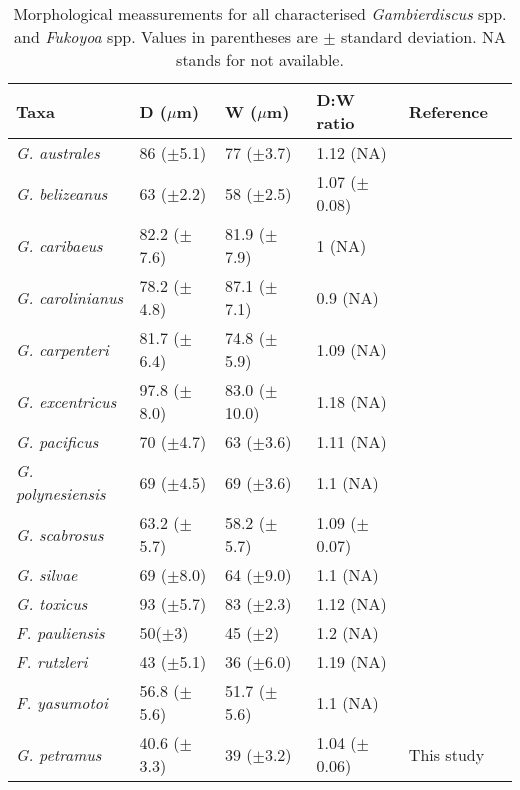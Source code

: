 \documentclass[12pt]{article}
\begin{document}
\FloatBarrier
\begin{table}
\caption{Morphological meassurements for all characterised \emph{Gambierdiscus} spp. and \emph{Fukoyoa} spp. Values in parentheses are $\pm$ standard deviation. NA stands for not available.}
\label{tbl:GlobalSizeTable}
\begin{tabular}{ | p{3.5cm} | p{2.5cm} | p{2.5cm} | p{2.5cm} | p{2.5cm} | p{1.8cm} | }
\hline
\textbf{Taxa} &  \textbf{D ($\mu$m)} & \textbf{W ($\mu$m)}  & \textbf{D:W ratio} & \textbf{Reference} \\
 \hline
\textit{G. australes}	& 86 ($\pm$5.1) & 77 ($\pm$3.7) & 1.12 (NA) & \cite{chinain1999morphology} \\
 \hline
 \textit{G. belizeanus}	& 63 ($\pm$2.2) & 58 ($\pm$2.5) & 1.07 ($\pm$0.08) & \cite{chinain1999morphology} \\
 \hline
 \textit{G. caribaeus}	& 82.2 ($\pm$7.6)	& 81.9 ($\pm$7.9)	& 1 (NA) & \cite{litaker2009taxonomy}\\
 \hline
 \textit{G. carolinianus} & 78.2 ($\pm$4.8) & 87.1 ($\pm$7.1) & 0.9 (NA) & \cite{litaker2009taxonomy} \\
 \hline
\textit{G. carpenteri} &	81.7 ($\pm$6.4) &	74.8 ($\pm$5.9) & 1.09 (NA) & \cite{litaker2009taxonomy} \\
 \hline
\textit{G. excentricus	}& 97.8 ($\pm$8.0) &	83.0 ($\pm$10.0) & 1.18 (NA) & \cite{litaker2009taxonomy} \\
 \hline
\textit{G. pacificus}	& 70 ($\pm$4.7) & 63 ($\pm$3.6) & 1.11 (NA) & \cite{chinain1999morphology}\\
 \hline
\textit{G. polynesiensis} & 69 ($\pm$4.5) & 69 ($\pm$3.6) & 1.1 (NA) &	\cite{chinain1999morphology} \\ 
 \hline
\textit{G. scabrosus}	& 63.2 ($\pm$5.7) & 58.2 ($\pm$5.7) & 1.09 ($\pm$0.07) & \cite{nishimura2014morphology}\\
 \hline
 \textit{G. silvae}	& 69 ($\pm$8.0) & 64 ($\pm$9.0) & 1.1 (NA) & \cite{fraga2014genus,litaker2010global}\\
 \hline
\textit{G. toxicus}	& 93 ($\pm$5.7) & 83 ($\pm$2.3) & 1.12 (NA) & \cite{litaker2009taxonomy}\\
 \hline
 \textit{F. pauliensis} & 50($\pm$3) & 45 ($\pm$2) & 1.2 (NA) & \cite{gomez2015fukuyoa} \\
 \hline
\textit{F. rutzleri }& 43 ($\pm$5.1)	& 36 ($\pm$6.0) & 1.19 (NA) & \cite{litaker2009taxonomy}\\
 \hline
\textit{F. yasumotoi }& 56.8 ($\pm$5.6)	& 51.7 ($\pm$5.6) & 1.1 (NA) & \cite{litaker2009taxonomy} \\
 \hline
\textit{G. petramus}  & 40.6 ($\pm$3.3) & 39 ($\pm$3.2) & 1.04 ($\pm$0.06) & This study \\
   \hline
\end{tabular}
\end{table}
\FloatBarrier

\newpage


\end{document}
